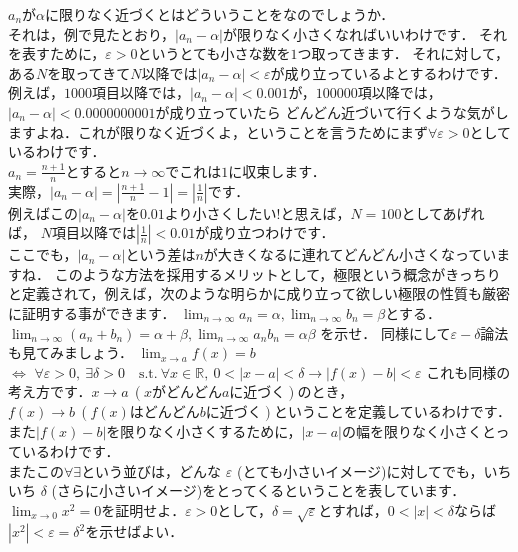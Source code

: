 $a_n$が$\alpha$に限りなく近づくとはどういうことをなのでしょうか．\\
それは，例で見たとおり，$|a_n - \alpha|$が限りなく小さくなればいいわけです．
それを表すために，$\varepsilon > 0$というとても小さな数を$1$つ取ってきます．
それに対して，ある$N$を取ってきて$N$以降では$|a_n - \alpha | < \varepsilon$が成り立っているよとするわけです．\\
例えば，$1000$項目以降では，$|a_n - \alpha| < 0.001$が，$100000$項以降では，$|a_n - \alpha | < 0.0000000001$が成り立っていたら
どんどん近づいて行くような気がしますよね．これが限りなく近づくよ，ということを言うためにまず$\forall \varepsilon > 0$としているわけです．\\
\ex
$a_n = \frac{n+1}{n}$とすると$n \to \infty $でこれは$1$に収束します．\\
実際，$|a_n - \alpha| = | \frac{n+1}{n} - 1 | = | \frac{1}{n} |$です．\\
例えばこの$|a_n - \alpha|$を$0.01$より小さくしたい!と思えば，$N=100$としてあげれば，
$N$項目以降では$|\frac{1}{n}| < 0.01$が成り立つわけです．\\
ここでも，$|a_n - \alpha| $という差は$n$が大きくなるに連れてどんどん小さくなっていますね．
\exx
このような方法を採用するメリットとして，極限という概念がきっちりと定義されて，例えば，次のような明らかに成り立って欲しい極限の性質も厳密に証明する事ができます．
\prob
$\lim_{n\to\infty} a_n = \alpha , \lim_{n\to\infty} b_n = \beta $とする．\\
$\lim_{n\to\infty} (a_n + b_n) = \alpha + \beta , \lim_{n\to\infty} a_n b_n = \alpha\beta $
を示せ．
\probx
同様にして$\varepsilon-\delta$論法も見てみましょう．
$\lim_{x \to a}f(x) = b$\\
$\iff$
$\forall \varepsilon > 0,\  \exists \delta > 0\quad \textrm{s.t.}\  \forall x \in \mathbb{R},\  0 < |x-a| < \delta \to |f(x)-b| < \varepsilon$
これも同様の考え方です．$x\to a\  (xがどんどんaに近づく)$のとき，$f(x) \to b\  (f(x)はどんどんbに近づく)$ということを定義しているわけです．また$|f(x)-b|$を限りなく小さくするために，$|x-a|$の幅を限りなく小さくとっているわけです．\\
またこの$\forall \exists$という並びは，どんな $\varepsilon$ (とても小さいイメージ)に対してでも，いちいち $\delta$ (さらに小さいイメージ)をとってくるということを表しています．
\prob
$\lim_{x\to 0} x^2 = 0$を証明せよ．$\varepsilon >0$として，$\delta = \sqrt{\varepsilon}$とすれば，$ 0 < | x | < \delta$ならば$ |x^2| < \varepsilon = \delta^2$を示せばよい． 
\probx
{}
